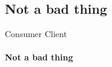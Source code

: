 \subsection{Not a bad thing}

\begin{frame}{Consumer Client}
    \framesubtitle{Not a bad thing}

\end{frame}

